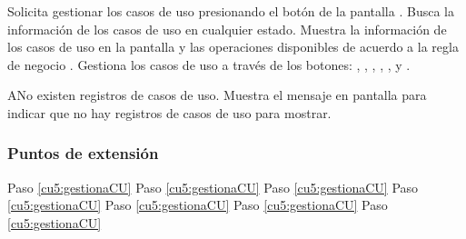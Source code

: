  \begin{UCtrayectoria}
    \UCpaso[\UCactor] Solicita gestionar los casos de uso presionando el botón \btnCU de la pantalla .
    \UCpaso[\UCsist] Busca la información de los casos de uso en cualquier estado. 
    \UCpaso[\UCsist] Muestra la información de los casos de uso en la pantalla  y las operaciones 
    disponibles de acuerdo a la regla de negocio . 
    \UCpaso[\UCactor] Gestiona los casos de uso a través de los botones: , \btnTray, \btnExt, \btnConsulta, \btnEditar, \btnEliminar y \btnRevisar. \label{cu5:gestionaCU}
 \end{UCtrayectoria}
 
 \begin{UCtrayectoriaA}{A}{No existen registros de casos de uso.}
    \UCpaso[\UCsist] Muestra el mensaje  en pantalla  
    para indicar que no hay registros de casos de uso para mostrar.
 \end{UCtrayectoriaA}
 

\subsubsection{Puntos de extensión}

	{Paso \ref{cu5:gestionaCU}}
	{}
	{Paso \ref{cu5:gestionaCU}}
	{}
	{Paso \ref{cu5:gestionaCU}}
	{}
	{Paso \ref{cu5:gestionaCU}}
	{}	
	{Paso \ref{cu5:gestionaCU}}
	{}
	{Paso \ref{cu5:gestionaCU}}
	{}
	{Paso \ref{cu5:gestionaCU}}
	{}
  